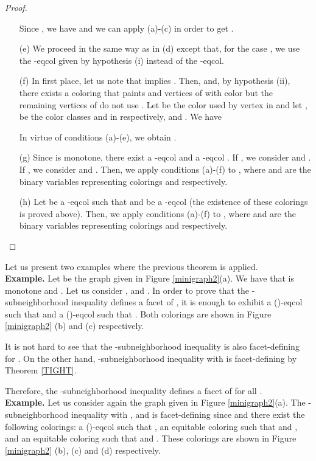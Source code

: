 \begin{proof}
\begin{enumerate}
Since , we have  and we can apply (a)-(c) in order to
get .
\item[(e)] We proceed in the same way as in (d) except that, for the case , we use the
-eqcol given by hypothesis (i) instead of the
-eqcol.
\item[(f)] In first place, let us note that  implies .
Then,  and, by hypothesis (ii), there exists a coloring  that paints 
and  vertices of  with color  but the remaining vertices of  do not use .
Let  be the color used by vertex  in  and let ,  be the color classes  and  in
 respectively, and . We have

In virtue of conditions (a)-(e), we obtain .
\item[(g)] Since  is monotone, there exist a -eqcol  and a -eqcol .
If , we consider  and . If , we consider
 and . Then, we apply conditions (a)-(f)
to , where  and  are the binary variables representing
colorings  and  respectively.
\item[(h)] Let  be a -eqcol such that  and  be a -eqcol (the existence of these
colorings is proved above). Then, we apply conditions (a)-(f) to ,
where  and  are the binary variables representing colorings  and  respectively.
\end{enumerate}
\end{proof}

Let us present two examples where the previous theorem is applied.\\

\noindent \textbf{Example.} Let  be the graph given in Figure \ref{minigraph2}(a). We have that  is
monotone and . Let us consider ,  and . In order to prove that the -subneighborhood inequality
defines a facet of , it is enough to exhibit a ()-eqcol
such that  and a ()-eqcol such that .
Both colorings are shown in Figure \ref{minigraph2} (b) and (c) respectively.

It is not hard to see that the -subneighborhood inequality is also facet-defining for
.
On the other hand, -subneighborhood inequality with 
is facet-defining by Theorem \ref{TIGHT}.

Therefore, the -subneighborhood inequality defines a facet of  for all .\\

\noindent \textbf{Example.} Let us consider again the graph given in Figure \ref{minigraph2}(a). The -subneighborhood inequality with ,  and 
is facet-defining since  and there exist the following colorings:
a ()-eqcol such that
, an equitable coloring such that  and , and
an equitable coloring such that  and .
These colorings are shown in Figure \ref{minigraph2} (b), (c) and (d) respectively.

